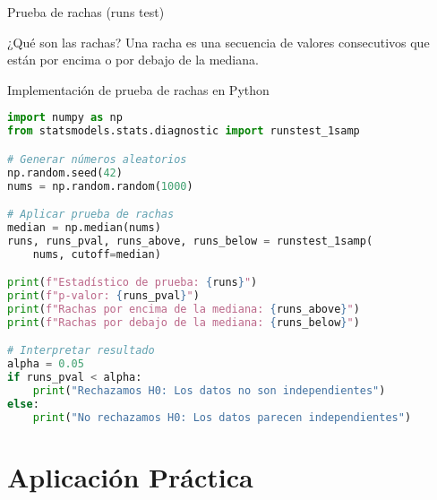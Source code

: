 \documentclass[aspectratio=169]{beamer}
\begin{document}
\begin{frame}{Prueba de rachas (runs test)}
    \begin{exampleblock}{¿Qué son las rachas?}
        Una racha es una secuencia de valores consecutivos que están por encima o por debajo de la mediana.
    \end{exampleblock}
    
\end{frame}

\begin{frame}{Implementación de prueba de rachas en Python}
    \begin{lstlisting}[language=Python]
import numpy as np
from statsmodels.stats.diagnostic import runstest_1samp

# Generar números aleatorios
np.random.seed(42)
nums = np.random.random(1000)

# Aplicar prueba de rachas
median = np.median(nums)
runs, runs_pval, runs_above, runs_below = runstest_1samp(
    nums, cutoff=median)

print(f"Estadístico de prueba: {runs}")
print(f"p-valor: {runs_pval}")
print(f"Rachas por encima de la mediana: {runs_above}")
print(f"Rachas por debajo de la mediana: {runs_below}")

# Interpretar resultado
alpha = 0.05
if runs_pval < alpha:
    print("Rechazamos H0: Los datos no son independientes")
else:
    print("No rechazamos H0: Los datos parecen independientes")
    \end{lstlisting}
\end{frame}

\section{Aplicación Práctica}
\end{document}
